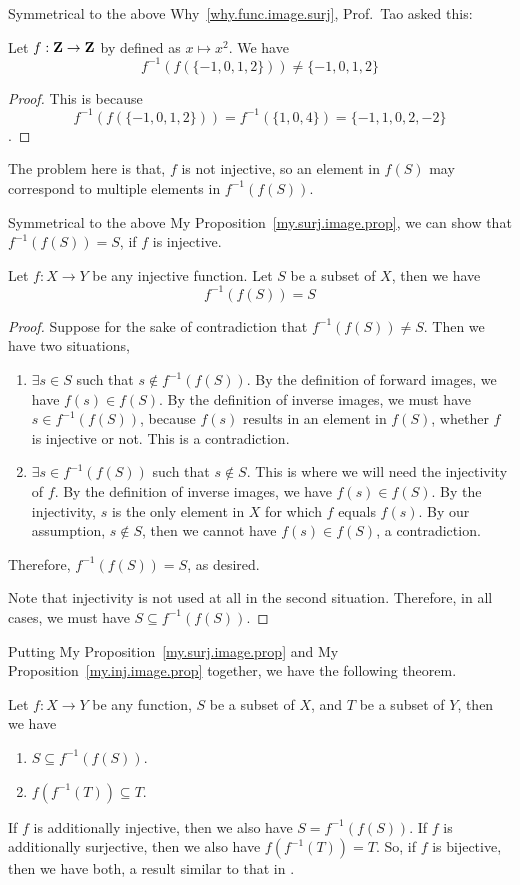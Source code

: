 Symmetrical to the above Why~\ref{why.func.image.surj}, Prof.~Tao asked this:
\begin{why}{49}
	Let $f: \mathbf{Z} \to \mathbf{Z}$ by defined as $x \mapsto x^2$. We have
	\[
		f^{-1}(f(\{-1,0,1,2\})) \ne \{-1,0,1,2\}
	\]
\end{why}
\begin{proof}
This is because 
\[
	f^{-1}(f(\{-1,0,1,2\})) = f^{-1}(\{1,0,4\}) = \{-1,1,0,2,-2\}
\].
\end{proof}

The problem here is that, $f$ is not injective, so an element in $f(S)$ may correspond to multiple elements in $f^{-1}(f(S))$.

Symmetrical to the above My Proposition~\ref{my.surj.image.prop}, we can show that $f^{-1}(f(S)) = S$, if $f$ is injective.
\begin{prop}\label{my.inj.image.prop}
	Let $f: X \to Y$ be any injective function. Let $S$ be a subset of $X$, then we have
	\[
		f^{-1}(f(S)) = S
	\]
\end{prop}
\begin{proof}
	Suppose for the sake of contradiction that $f^{-1}(f(S)) \ne S$. Then we have two situations,
	\begin{enumerate}
		\item $\exists s \in S$ such that $s \notin f^{-1}(f(S))$. By the definition of forward images, we have $f(s) \in f(S)$. By the definition of inverse images, we must have $s \in f^{-1}(f(S))$, because $f(s)$ results in an element in $f(S)$, whether $f$ is injective or not. This is a contradiction.
		
		\item $\exists s \in f^{-1}(f(S))$ such that $s \notin S$. This is where we will need the injectivity of $f$. By the definition of inverse images, we have $f(s) \in f(S)$. By the injectivity, $s$ is the only element in $X$ for which $f$ equals $f(s)$. By our assumption, $s \notin S$, then we cannot have $f(s) \in f(S)$, a contradiction.
	\end{enumerate}
	Therefore, $f^{-1}(f(S)) = S$, as desired.

	Note that injectivity is not used at all in the second situation. Therefore, in all cases, we must have $S \subseteq f^{-1}(f(S))$.
\end{proof}

Putting My Proposition~\ref{my.surj.image.prop} and My Proposition~\ref{my.inj.image.prop} together, we have the following theorem.
\begin{thm}\label{my.inj.surj.image.thm}
	Let $f: X \to Y$ be any function, $S$ be a subset of $X$, and $T$ be a subset of $Y$, then we have
	\begin{enumerate}
		\item $S \subseteq f^{-1}(f(S))$.
		\item $f(f^{-1}(T)) \subseteq T$.
	\end{enumerate}

	If $f$ is additionally injective, then we also have $S = f^{-1}(f(S))$. If $f$ is additionally surjective, then we also have $f(f^{-1}(T)) = T$. So, if $f$ is bijective, then we have both, a result similar to that in .
\end{thm}

